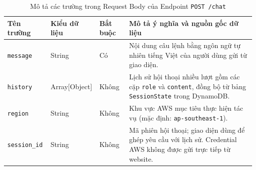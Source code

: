 \documentclass[a4paper,12pt]{article}
\begin{document}
\begin{table}[H]
\centering
\caption{Mô tả các trường trong Request Body của Endpoint \texttt{POST /chat}}
\label{tab:chat_request}
\begingroup
\renewcommand{\arraystretch}{1.12}
\fontsize{10}{13}\selectfont
\begin{tabularx}{\linewidth}{@{}>{\raggedright\arraybackslash}p{2.5cm}>{\raggedright\arraybackslash}p{2.3cm}>{\centering\arraybackslash}p{1.8cm}Y@{}}
\toprule
\textbf{Tên trường} & \textbf{Kiểu dữ liệu} & \textbf{Bắt buộc} & \textbf{Mô tả ý nghĩa và nguồn gốc dữ liệu} \\
\midrule
\texttt{message} & String & Có & Nội dung câu lệnh bằng ngôn ngữ tự nhiên tiếng Việt của người dùng gửi từ giao diện. \\
\texttt{history} & Array[Object] & Không & Lịch sử hội thoại nhiều lượt gồm các cặp \texttt{role} và \texttt{content}, đồng bộ từ bảng \texttt{SessionState} trong DynamoDB. \\
\texttt{region} & String & Không & Khu vực AWS mục tiêu thực hiện tác vụ (mặc định: \texttt{ap-southeast-1}). \\
\texttt{session\_id} & String & Không & Mã phiên hội thoại; giao diện dùng để ghép yêu cầu với lịch sử. Credential AWS không được gửi trực tiếp từ website. \\
\bottomrule
\end{tabularx}
\endgroup
\end{table}
\end{document}
